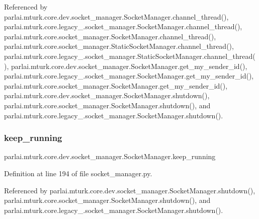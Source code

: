 Referenced by parlai.\+mturk.\+core.\+dev.\+socket\+\_\+manager.\+Socket\+Manager.\+channel\+\_\+thread(), parlai.\+mturk.\+core.\+legacy\+\_.\+socket\+\_\+manager.\+Socket\+Manager.\+channel\+\_\+thread(), parlai.\+mturk.\+core.\+socket\+\_\+manager.\+Socket\+Manager.\+channel\+\_\+thread(), parlai.\+mturk.\+core.\+socket\+\_\+manager.\+Static\+Socket\+Manager.\+channel\+\_\+thread(), parlai.\+mturk.\+core.\+legacy\+\_.\+socket\+\_\+manager.\+Static\+Socket\+Manager.\+channel\+\_\+thread(), parlai.\+mturk.\+core.\+dev.\+socket\+\_\+manager.\+Socket\+Manager.\+get\+\_\+my\+\_\+sender\+\_\+id(), parlai.\+mturk.\+core.\+legacy\+\_.\+socket\+\_\+manager.\+Socket\+Manager.\+get\+\_\+my\+\_\+sender\+\_\+id(), parlai.\+mturk.\+core.\+socket\+\_\+manager.\+Socket\+Manager.\+get\+\_\+my\+\_\+sender\+\_\+id(), parlai.\+mturk.\+core.\+dev.\+socket\+\_\+manager.\+Socket\+Manager.\+shutdown(), parlai.\+mturk.\+core.\+socket\+\_\+manager.\+Socket\+Manager.\+shutdown(), and parlai.\+mturk.\+core.\+legacy\+\_.\+socket\+\_\+manager.\+Socket\+Manager.\+shutdown().

\mbox{\label{classparlai_1_1mturk_1_1core_1_1dev_1_1socket__manager_1_1SocketManager_aa5fc9379d235110216f063e11e65da54}} 
\subsubsection{\texorpdfstring{keep\+\_\+running}{keep\_running}}
{\footnotesize\ttfamily parlai.\+mturk.\+core.\+dev.\+socket\+\_\+manager.\+Socket\+Manager.\+keep\+\_\+running}



Definition at line 194 of file socket\+\_\+manager.\+py.



Referenced by parlai.\+mturk.\+core.\+dev.\+socket\+\_\+manager.\+Socket\+Manager.\+shutdown(), parlai.\+mturk.\+core.\+socket\+\_\+manager.\+Socket\+Manager.\+shutdown(), and parlai.\+mturk.\+core.\+legacy\+\_.\+socket\+\_\+manager.\+Socket\+Manager.\+shutdown().

